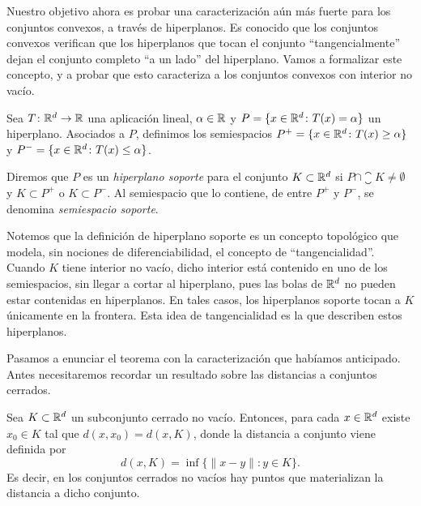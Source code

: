Nuestro objetivo ahora es probar una caracterización aún más fuerte para los conjuntos convexos, a través de hiperplanos. Es conocido que los conjuntos convexos verifican que los hiperplanos que tocan el conjunto ``tangencialmente'' dejan el conjunto completo ``a un lado'' del hiperplano. Vamos a formalizar este concepto, y a probar que esto caracteriza a los conjuntos convexos con interior no vacío.

\begin{definition}
    Sea $T \colon \mathbb{R}^d \to \mathbb{R}$ una aplicación lineal, $\alpha \in\mathbb{R}$ y $P = \{x \in \mathbb{R}^d \colon T(x) = \alpha \}$ un hiperplano. Asociados a $P$, definimos los semiespacios $P^+ = \{x \in \mathbb{R}^d \colon T(x) \ge \alpha \}$ y $P^- = \{x \in \mathbb{R}^d \colon T(x) \le \alpha \}$.

    Diremos que $P$ es un \emph{hiperplano soporte} para el conjunto $K \subset \mathbb{R}^d$ si $P \cap \closure{K} \ne \emptyset$ y $K \subset P^+$ o $K \subset P^-$. Al semiespacio que lo contiene, de entre $P^+$ y $P^-$, se denomina \emph{semiespacio soporte}.
\end{definition}

Notemos que la definición de hiperplano soporte es un concepto topológico que modela, sin nociones de diferenciabilidad, el concepto de ``tangencialidad''. Cuando $K$ tiene interior no vacío, dicho interior está contenido en uno de los semiespacios, sin llegar a cortar al hiperplano, pues las bolas de $\mathbb{R}^d$ no pueden estar contenidas en hiperplanos. En tales casos, los hiperplanos soporte tocan a $K$ únicamente en la frontera. Esta idea de tangencialidad es la que describen estos hiperplanos.

Pasamos a enunciar el teorema con la caracterización que habíamos anticipado. Antes necesitaremos recordar un resultado sobre las distancias a conjuntos cerrados.



\begin{prop} \label{prop:mat_dist}
    Sea $K \subset \mathbb{R}^d$ un subconjunto cerrado no vacío. Entonces, para cada $x \in \mathbb{R}^d$ existe $x_0 \in K$ tal que $d(x,x_0) = d(x,K)$, donde la distancia a conjunto viene definida por
    \[ d(x,K) = \inf\{\|x-y\| \colon y \in K \}. \]
    Es decir, en los conjuntos cerrados no vacíos hay puntos que materializan la distancia a dicho conjunto.
\end{prop}

